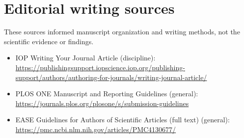 \documentclass[11pt]{article}
\begin{document}
\section{Editorial writing sources}
These sources informed manuscript organization and writing methods, not the scientific evidence or findings.
\begin{itemize}
\item IOP \textemdash{} Writing Your Journal Article (discipline): \url{https://publishingsupport.iopscience.iop.org/publishing-support/authors/authoring-for-journals/writing-journal-article/}
\item PLOS ONE \textemdash{} Manuscript and Reporting Guidelines (general): \url{https://journals.plos.org/plosone/s/submission-guidelines}
\item EASE \textemdash{} Guidelines for Authors of Scientific Articles (full text) (general): \url{https://pmc.ncbi.nlm.nih.gov/articles/PMC4130677/}
\end{itemize}
\end{document}
